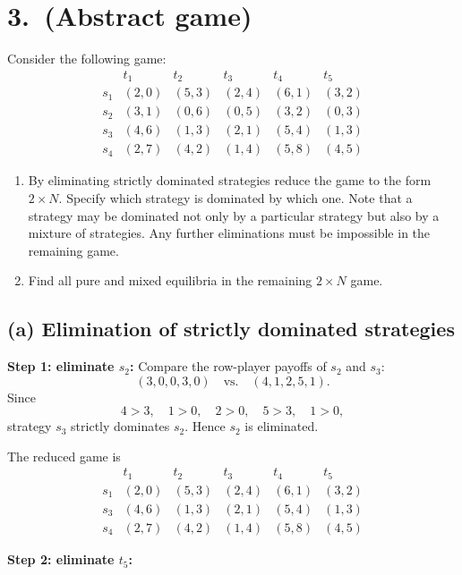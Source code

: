 \section*{3.\ (Abstract game)}

Consider the following game:
\[
\begin{array}{c|ccccc}
 & t_1 & t_2 & t_3 & t_4 & t_5\\
\hline
s_1 & (2,0) & (5,3) & (2,4) & (6,1) & (3,2)\\
s_2 & (3,1) & (0,6) & (0,5) & (3,2) & (0,3)\\
s_3 & (4,6) & (1,3) & (2,1) & (5,4) & (1,3)\\
s_4 & (2,7) & (4,2) & (1,4) & (5,8) & (4,5)
\end{array}
\]

\begin{enumerate}
\item[(a)]
By eliminating strictly dominated strategies reduce the game to the form \(2\times N\).
Specify which strategy is dominated by which one.
Note that a strategy may be dominated not only by a particular strategy but also by a mixture of strategies.
Any further eliminations must be impossible in the remaining game.

\item[(b)]
Find all pure and mixed equilibria in the remaining \(2\times N\) game.
\end{enumerate}

\subsection*{(a) Elimination of strictly dominated strategies}

\textbf{Step 1: eliminate \(s_2\):}
Compare the row-player payoffs of \(s_2\) and \(s_3\):
\[
(3,0,0,3,0) \quad \text{vs.} \quad (4,1,2,5,1).
\]
Since
\[
4>3,\quad 1>0,\quad 2>0,\quad 5>3,\quad 1>0,
\]
strategy \(s_3\) strictly dominates \(s_2\). Hence \(s_2\) is eliminated.

The reduced game is
\[
\begin{array}{c|ccccc}
 & t_1 & t_2 & t_3 & t_4 & t_5\\
\hline
s_1 & (2,0) & (5,3) & (2,4) & (6,1) & (3,2)\\
s_3 & (4,6) & (1,3) & (2,1) & (5,4) & (1,3)\\
s_4 & (2,7) & (4,2) & (1,4) & (5,8) & (4,5)
\end{array}
\]

\textbf{Step 2: eliminate \(t_5\):}




